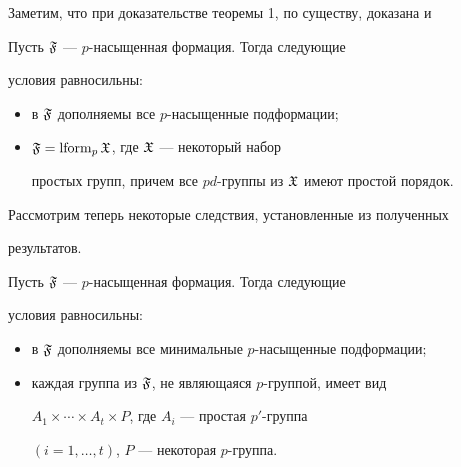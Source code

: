  


Заметим, что при доказательстве теоремы 1, по существу, доказана и 


 


\begin{thm} Пусть $\frak F$ --- $p$-насыщенная формация. Тогда следующие 


условия равносильны: 


\begin{itemize} 


\item[1)] в $\frak F$ дополняемы все $p$-насыщенные подформации; 


\item[2)] $\frak F=\operatorname{lform}_p\frak X$, где $\frak X$ --- некоторый набор 


простых групп, причем все $pd$-группы из $\frak X$ имеют простой порядок. 


\end{itemize} 


\end{thm} 


 


Рассмотрим теперь некоторые следствия, установленные из полученных 


результатов. 


 


\begin{cor} Пусть $\frak F$ --- $p$-насыщенная формация. Тогда следующие 


условия равносильны: 


\begin{itemize} 


\item[1)] в $\frak F$ дополняемы все минимальные $p$-насыщенные подформации; 


\item[2)] каждая группа из $\frak F$, не являющаяся $p$-группой, имеет вид 


$A_1\times\dotsb\times A_t\times P$, где $A_i$ --- простая $p'$-группа 


$(i=1,\dotsc,t)$, $P$ --- некоторая $p$-группа. 


\end{itemize} 


\end{cor} 


 


